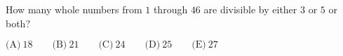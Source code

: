 

How many whole numbers from $1$ through $46$ are divisible by either $3$ or $5$ or both?

$\text{(A)}\ 18 \qquad \text{(B)}\ 21 \qquad \text{(C)}\ 24 \qquad \text{(D)}\ 25 \qquad \text{(E)}\ 27$
